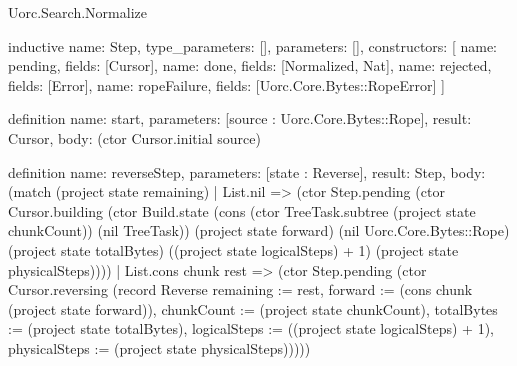 \begin{lexlean}{Uorc.Search.Normalize}
\begin{semanticmodule}
inductive{
  name: Step,
  type_parameters: [],
  parameters: [],
  constructors: [
    {name: pending, fields: [Cursor]},
    {name: done, fields: [Normalized, Nat]},
    {name: rejected, fields: [Error]},
    {name: ropeFailure, fields: [Uorc.Core.Bytes::RopeError]}
  ]
}

definition{
  name: start,
  parameters: [source : Uorc.Core.Bytes::Rope],
  result: Cursor,
  body: (ctor Cursor.initial source)
}

definition{
  name: reverseStep,
  parameters: [state : Reverse],
  result: Step,
  body: (match (project state remaining)
    | List.nil => (ctor Step.pending (ctor Cursor.building (ctor Build.state (cons (ctor TreeTask.subtree (project state chunkCount)) (nil TreeTask)) (project state forward) (nil Uorc.Core.Bytes::Rope) (project state totalBytes) ((project state logicalSteps) + 1) (project state physicalSteps))))
    | List.cons chunk rest => (ctor Step.pending (ctor Cursor.reversing (record Reverse {remaining := rest, forward := (cons chunk (project state forward)), chunkCount := (project state chunkCount), totalBytes := (project state totalBytes), logicalSteps := ((project state logicalSteps) + 1), physicalSteps := (project state physicalSteps)}))))
}


\end{semanticmodule}
\end{lexlean}

